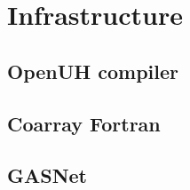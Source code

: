 \chapter{Infrastructure}\label{chap:Methods }
\section{OpenUH compiler}
\section{Coarray Fortran}
\section{GASNet}

